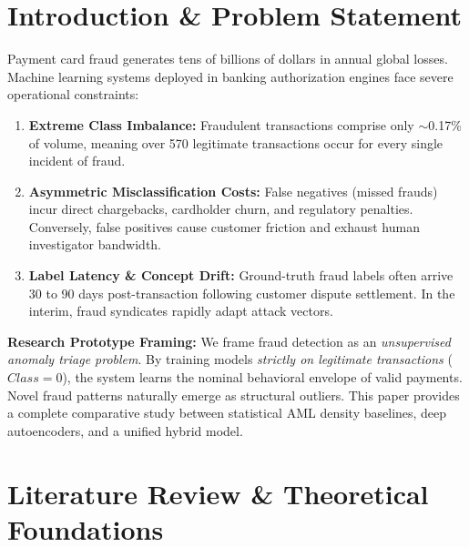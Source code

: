\documentclass[conference]{IEEEtran}
\begin{document}
\section{Introduction \& Problem Statement}
Payment card fraud generates tens of billions of dollars in annual global losses. Machine learning systems deployed in banking authorization engines face severe operational constraints:
\begin{enumerate}
    \item \textbf{Extreme Class Imbalance:} Fraudulent transactions comprise only $\sim$0.17\% of volume, meaning over 570 legitimate transactions occur for every single incident of fraud.
    \item \textbf{Asymmetric Misclassification Costs:} False negatives (missed frauds) incur direct chargebacks, cardholder churn, and regulatory penalties. Conversely, false positives cause customer friction and exhaust human investigator bandwidth.
    \item \textbf{Label Latency \& Concept Drift:} Ground-truth fraud labels often arrive 30 to 90 days post-transaction following customer dispute settlement. In the interim, fraud syndicates rapidly adapt attack vectors.
\end{enumerate}

\noindent\textbf{Research Prototype Framing:} We frame fraud detection as an \textit{unsupervised anomaly triage problem}. By training models \textit{strictly on legitimate transactions} ($Class = 0$), the system learns the nominal behavioral envelope of valid payments. Novel fraud patterns naturally emerge as structural outliers. This paper provides a complete comparative study between statistical AML density baselines, deep autoencoders, and a unified hybrid model.

\section{Literature Review \& Theoretical Foundations}
\end{document}
